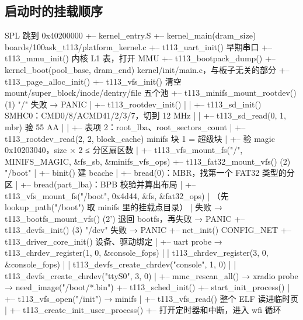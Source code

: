 \subsection{启动时的挂载顺序}

\begin{txtcode}[basicstyle=\ttfamily\scriptsize]
SPL 跳到 0x40200000
+-- kernel_entry.S
    +-- kernel_main(dram_size)                     boards/100ask_t113/platform_kernel.c
        +-- t113_uart_init()                       早期串口
        +-- t113_mmu_init()                        内核 L1 表，打开 MMU
        +-- t113_bootpack_dump()
        +-- kernel_boot(pool_base, dram_end)        kernel/init/main.c，与板子无关的部分
            +-- t113_page_alloc_init()
            +-- t113_vfs_init()                    清空 mount/super_block/inode/dentry/file 五个池
            +-- t113_minifs_mount_rootdev()        (1) "/"   失败 → PANIC
            |   +-- t113_rootdev_init()
            |   |   +-- t113_sd_init()             SMHC0：CMD0/8/ACMD41/2/3/7，切到 12 MHz
            |   |   +-- t113_sd_read(0, 1, mbr)    验 55 AA
            |   |   +-- 表项 2：root_lba、root_sectors_count
            |   +-- t113_rootdev_read(2, 2, block_cache)     minifs 块 1 = 超级块
            |   +-- 验 magic 0x10203040，size × 2 ≤ 分区扇区数
            |   +-- t113_vfs_mount_fs("/", MINIFS_MAGIC, &fs_sb, &minifs_vfs_ops)
            +-- t113_fat32_mount_vfs()             (2) "/boot"
            |   +-- binit()                        建 bcache
            |   +-- bread(0)：MBR，找第一个 FAT32 类型的分区
            |   +-- bread(part_lba)：BPB 校验并算出布局
            |   +-- t113_vfs_mount_fs("/boot", 0x4d44, &fs, &fat32_ops)
            |       （先 lookup_path("/boot") 取 minifs 里的挂载点目录）
            |   失败 → t113_bootfs_mount_vfs()     (2') 退回 bootfs，再失败 → PANIC
            +-- t113_devfs_init()                  (3) "/dev"  失败 → PANIC
            +-- net_init()                         CONFIG_NET
            +-- t113_driver_core_init()            设备、驱动绑定
            |   +-- uart probe → t113_chrdev_register(1, 0, &console_fops)
            |   |                t113_chrdev_register(3, 0, &console_fops)
            |   |                t113_devfs_create_chrdev("console", 1, 0)
            |   |                t113_devfs_create_chrdev("ttyS0", 3, 0)
            |   +-- mmc_rescan_all() → xradio probe → need_image("/boot/*.bin")
            +-- t113_sched_init()
            +-- start_init_process()
            |   +-- t113_vfs_open("/init") → minifs
            |   +-- t113_vfs_read() 整个 ELF 读进临时页
            |   +-- t113_create_init_user_process()
            +-- 打开定时器和中断，进入 wfi 循环
\end{txtcode}

